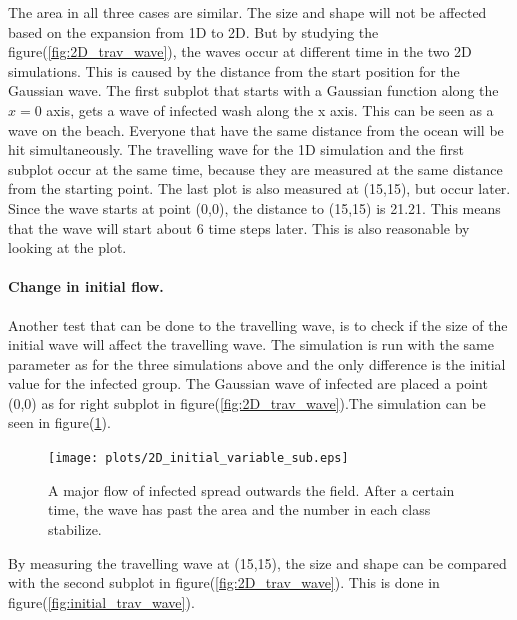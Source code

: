\documentclass[%
twoside,                 %
final,                   %
10pt]{article}
\begin{document}
\noindent
The area in all three cases are similar. The size and shape will not be affected based on the expansion from 1D to 2D. But by studying the figure(\ref{fig:2D_trav_wave}), the waves occur at different time in the two 2D simulations. This is caused by the distance from the start position for the Gaussian wave. The first subplot that starts with a Gaussian function along the $x=0$ axis, gets a wave of infected wash along the x axis. This can be seen as a wave on the beach. Everyone that have the same distance from the ocean will be hit simultaneously. The travelling wave for the 1D simulation and the first subplot occur at the same time, because they are measured at the same distance from the starting point. The last plot is also measured at (15,15), but occur later. Since the wave starts at point (0,0), the distance to (15,15) is 21.21. This means that the wave will start about 6 time steps later. This is also reasonable by looking at the plot.    


\paragraph{Change in initial flow.}
Another test that can be done to the travelling wave, is to check if the size of the initial wave will affect the travelling wave. The simulation is run with the same parameter as for the three simulations above and the only difference is the initial value for the infected group. The Gaussian wave of infected are placed a point (0,0) as for right subplot in figure(\ref{fig:2D_trav_wave}).The simulation can be seen in figure(\ref{fig:initial_value}).  

\begin{figure}[ht]
  \centerline{\texttt{[image: plots/2D\_initial\_variable\_sub.eps]}}
  \caption{
  \label{fig:initial_value} A major flow of infected spread outwards the field. After a certain time, the wave has past the area and the number in each class stabilize.
  }
\end{figure}


By measuring the travelling wave at (15,15), the size and shape can be compared with the second subplot in figure(\ref{fig:2D_trav_wave}). This is done in figure(\ref{fig:initial_trav_wave}).
\end{document}
